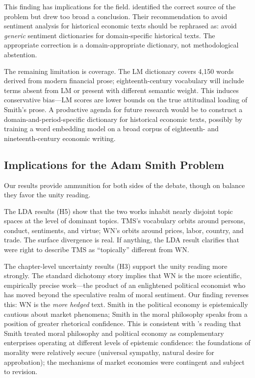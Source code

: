 \documentclass[12pt,a4paper]{article}
\begin{document}
This finding has implications for the field.
\citeauthor{Ballandonne2023} \citeyearpar{Ballandonne2023} identified
the correct source of the problem but drew too broad a conclusion.
Their recommendation to avoid sentiment analysis for historical economic
texts should be rephrased as: avoid \textit{generic} sentiment
dictionaries for domain-specific historical texts.
The appropriate correction is a domain-appropriate dictionary, not
methodological abstention.

The remaining limitation is coverage.
The LM dictionary covers 4,150 words derived from modern financial
prose; eighteenth-century vocabulary will include terms absent from LM
or present with different semantic weight.
This induces conservative bias---LM scores are lower bounds on
the true attitudinal loading of Smith's prose.
A productive agenda for future research would be to construct a
domain-and-period-specific dictionary for historical economic texts,
possibly by training a word embedding model on a broad corpus of
eighteenth- and nineteenth-century economic writing.

\subsection{Implications for the Adam Smith Problem}

Our results provide ammunition for both sides of the debate, though on
balance they favor the unity reading.

The LDA results (H5) show that the two works inhabit nearly disjoint
topic spaces at the level of dominant topics.
TMS's vocabulary orbits around persons, conduct, sentiments, and
virtue; WN's orbits around prices, labor, country, and trade.
The surface divergence is real.
If anything, the LDA result clarifies that \citeauthor{Ballandonne2023}
were right to describe TMS as ``topically'' different from WN.

The chapter-level uncertainty results (H3) support the unity reading
more strongly.
The standard dichotomy story implies that WN is the more scientific,
empirically precise work---the product of an enlightened political
economist who has moved beyond the speculative realm of moral sentiment.
Our finding reverses this: WN is the \textit{more hedged} text.
Smith in the political economy is epistemically cautious about market
phenomena; Smith in the moral philosophy speaks from a position of
greater rhetorical confidence.
This is consistent with \citeauthor{Evensky2005}'s reading that Smith
treated moral philosophy and political economy as complementary
enterprises operating at different levels of epistemic confidence:
the foundations of morality were relatively secure (universal sympathy,
natural desire for approbation); the mechanisms of market economies
were contingent and subject to revision.
\end{document}
